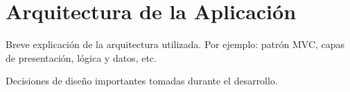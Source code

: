 \chapter{Arquitectura de la Aplicación}

Breve explicación de la arquitectura utilizada. Por ejemplo: patrón MVC, capas de presentación, lógica y datos, etc.

Decisiones de diseño importantes tomadas durante el desarrollo.
